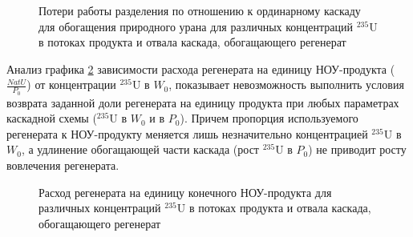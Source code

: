 \begin{figure}[ht]
  \caption{Потери работы разделения по отношению к ординарному каскаду для обогащения природного урана для различных концентраций $^{235}$U в потоках продукта и отвала каскада, обогащающего регенерат}\label{Figure_13}
\end{figure}

Анализ графика \ref{Figure_10} зависимости расхода регенерата на единицу НОУ-продукта ($\frac{NatU}{P_{0}}$) от концентрации $^{235}$U в $W_0$, показывает невозможность выполнить условия возврата заданной доли регенерата на единицу продукта при любых параметрах каскадной схемы ($^{235}$U в $W_0$ и в $P_0$). Причем пропорция используемого регенерата к НОУ-продукту меняется лишь незначительно концентрацией $^{235}$U в $W_0$, а удлинение обогащающей части каскада (рост $^{235}$U в $P_0$) не приводит росту вовлечения регенерата.

\begin{figure}[ht]
  \caption{Расход регенерата на единицу конечного НОУ-продукта для различных концентраций $^{235}$U в потоках продукта и отвала каскада, обогащающего регенерат}\label{Figure_10}
\end{figure}

